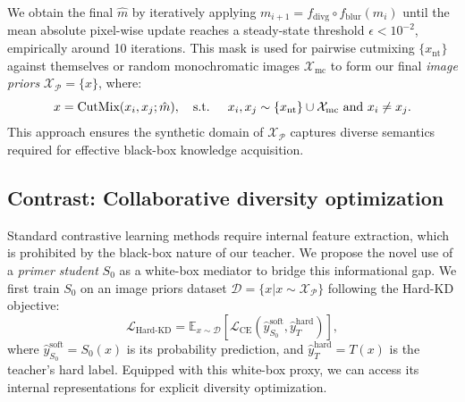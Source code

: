 \begin{foldable} %
  We obtain the final $\hat{m}$ by iteratively applying $m_{i+1} = f_\text{divg} \circ f_\text{blur}(m_i)$ until the mean absolute pixel-wise update reaches a steady-state threshold $\epsilon < 10^{-2}$, empirically around 10 iterations.
  This mask is used for pairwise cutmixing $\{x_\text{nt}\}$ against themselves or random monochromatic images $\mathcal{X}_\text{mc}$ to form our final \textit{image priors} $\mathcal{X}_\mathcal{P} = \{x\}$, where:
  \begin{equation} \label{eq:synthesis-semcutmix}
    x= \text{CutMix}(x_i, x_j; \hat{m}), \text{\quad s.t. \quad} x_i,x_j \sim \{x_\text{nt}\} \cup \mathcal{X}_\text{mc} \text{ and } x_i \ne x_j.
  \end{equation}
  This approach ensures the synthetic domain of $\mathcal{X}_\mathcal{P}$ captures diverse semantics required for effective black-box knowledge acquisition.
\end{foldable}

\subsection{Contrast: Collaborative diversity optimization} \label{ssec:03-framework-contrast}
\begin{foldable} %
  Standard contrastive learning methods require internal feature extraction, which is prohibited by the black-box nature of our teacher.
  We propose the novel use of a \textit{primer student} $S_{0}$ as a white-box mediator to bridge this informational gap.
  We first train $S_{0}$ on an image priors dataset $\mathcal{D} = \{x | x \sim \mathcal{X}_\mathcal{P}\}$ following the Hard-KD objective:
  \begin{equation} \label{eq:loss-hard-kd}
    \mathcal{L}_\text{Hard-KD} = \mathbb{E}_{x \sim \mathcal{D}} \left[\mathcal{L}_\text{CE} \left(\hat{y}_{S_0}^\text{soft}, \hat{y}_{T}^\text{hard} \right)\right],
  \end{equation}
  where $\hat{y}_{S_0}^\text{soft} = S_0(x)$ is its probability prediction, and $\hat{y}_{T}^\text{hard} = T(x)$ is the teacher's hard label.
  Equipped with this white-box proxy, we can access its internal representations for explicit diversity optimization.
\end{foldable}

